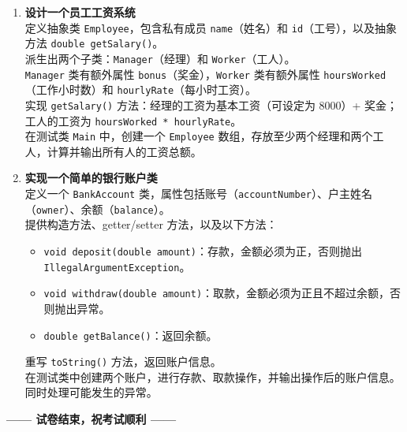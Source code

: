 \documentclass[a3paper, landscape, 11pt, twocolumn]{article}
\begin{document}
\begin{enumerate}[label=\arabic*., itemsep=1em]
	\item \textbf{设计一个员工工资系统} \\
	      定义抽象类 \texttt{Employee}，包含私有成员 \texttt{name}（姓名）和 \texttt{id}（工号），以及抽象方法 \texttt{double getSalary()}。\\
	      派生出两个子类：\texttt{Manager}（经理）和 \texttt{Worker}（工人）。\\
	      \texttt{Manager} 类有额外属性 \texttt{bonus}（奖金），\texttt{Worker} 类有额外属性 \texttt{hoursWorked}（工作小时数）和 \texttt{hourlyRate}（每小时工资）。\\
	      实现 \texttt{getSalary()} 方法：经理的工资为基本工资（可设定为 8000）+ 奖金；工人的工资为 \texttt{hoursWorked * hourlyRate}。\\
	      在测试类 \texttt{Main} 中，创建一个 \texttt{Employee} 数组，存放至少两个经理和两个工人，计算并输出所有人的工资总额。
	      \vspace{6cm}

	\item \textbf{实现一个简单的银行账户类} \\
	      定义一个 \texttt{BankAccount} 类，属性包括账号（\texttt{accountNumber}）、户主姓名（\texttt{owner}）、余额（\texttt{balance}）。\\
	      提供构造方法、getter/setter 方法，以及以下方法：
	      \begin{itemize}
		      \item \texttt{void deposit(double amount)}：存款，金额必须为正，否则抛出 \texttt{IllegalArgumentException}。
		      \item \texttt{void withdraw(double amount)}：取款，金额必须为正且不超过余额，否则抛出异常。
		      \item \texttt{double getBalance()}：返回余额。
	      \end{itemize}
	      重写 \texttt{toString()} 方法，返回账户信息。\\
	      在测试类中创建两个账户，进行存款、取款操作，并输出操作后的账户信息。同时处理可能发生的异常。
	      \vspace{6cm}
\end{enumerate}

\begin{center}
	\textbf{—— 试卷结束，祝考试顺利 ——}
\end{center}
\end{document}
